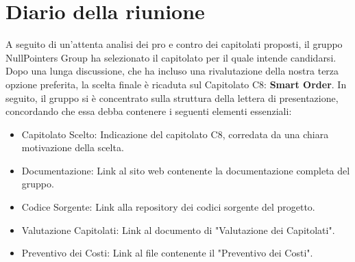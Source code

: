 \section{Diario della riunione}

A seguito di un'attenta analisi dei pro e contro dei capitolati proposti, il gruppo NullPointers Group ha selezionato il capitolato per il quale intende candidarsi.
Dopo una lunga discussione, che ha incluso una rivalutazione della nostra terza opzione preferita, la scelta finale è ricaduta sul Capitolato C8: \textbf{Smart Order}.
In seguito, il gruppo si è concentrato sulla struttura della lettera di presentazione, concordando che essa debba contenere i seguenti elementi essenziali:
\begin{itemize}
	\item Capitolato Scelto: Indicazione del capitolato C8, corredata da una chiara motivazione della scelta.
	\item Documentazione: Link al sito web contenente la documentazione completa del gruppo.
	\item Codice Sorgente: Link alla repository dei codici sorgente del progetto.
	\item Valutazione Capitolati: Link al documento di "Valutazione dei Capitolati".
	\item Preventivo dei Costi: Link al file contenente il "Preventivo dei Costi".
\end{itemize}